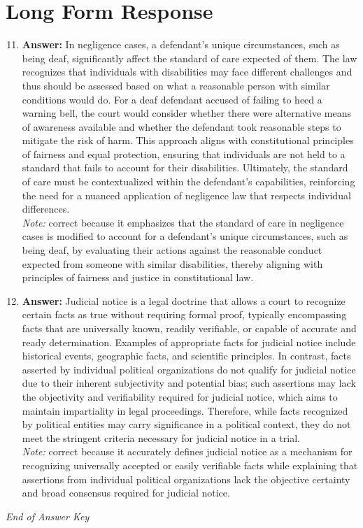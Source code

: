 \documentclass[12pt]{article}
\begin{document}
\section*{Long Form Response}
\begin{enumerate}[label=\arabic*.]
\setcounter{enumi}{10}
\item \textbf{Answer:} In negligence cases, a defendant's unique circumstances, such as being deaf, significantly affect the standard of care expected of them. The law recognizes that individuals with disabilities may face different challenges and thus should be assessed based on what a reasonable person with similar conditions would do. For a deaf defendant accused of failing to heed a warning bell, the court would consider whether there were alternative means of awareness available and whether the defendant took reasonable steps to mitigate the risk of harm. This approach aligns with constitutional principles of fairness and equal protection, ensuring that individuals are not held to a standard that fails to account for their disabilities. Ultimately, the standard of care must be contextualized within the defendant's capabilities, reinforcing the need for a nuanced application of negligence law that respects individual differences.
\\ \textit{Note:} correct because it emphasizes that the standard of care in negligence cases is modified to account for a defendant's unique circumstances, such as being deaf, by evaluating their actions against the reasonable conduct expected from someone with similar disabilities, thereby aligning with principles of fairness and justice in constitutional law.
\item \textbf{Answer:} Judicial notice is a legal doctrine that allows a court to recognize certain facts as true without requiring formal proof, typically encompassing facts that are universally known, readily verifiable, or capable of accurate and ready determination. Examples of appropriate facts for judicial notice include historical events, geographic facts, and scientific principles. In contrast, facts asserted by individual political organizations do not qualify for judicial notice due to their inherent subjectivity and potential bias; such assertions may lack the objectivity and verifiability required for judicial notice, which aims to maintain impartiality in legal proceedings. Therefore, while facts recognized by political entities may carry significance in a political context, they do not meet the stringent criteria necessary for judicial notice in a trial.
\\ \textit{Note:} correct because it accurately defines judicial notice as a mechanism for recognizing universally accepted or easily verifiable facts while explaining that assertions from individual political organizations lack the objective certainty and broad consensus required for judicial notice.
\end{enumerate}

\vfill
\noindent\textit{End of Answer Key}
\end{document}
